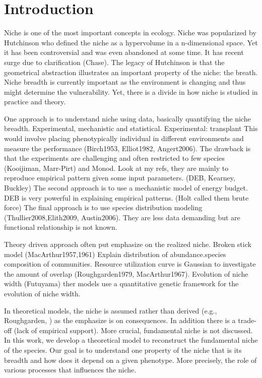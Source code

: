 \section*{Introduction}
Niche is one of the most important concepts in ecology.
Niche was popularized by Hutchinson \citet{Hutchinson1957} who defined the niche as a hypervolume in a n-dimensional space.
Yet it has been controversial and was even abandoned at some time.
It has recent surge due to clarification (Chase).
The legacy of Hutchinson is that the geometrical abstraction illustrates an important property of the niche: the breath.
Niche breadth is currently important as the environment is changing and thus might determine the vulnerability.
Yet, there is a divide in how niche is studied in practice and theory.

One approach is to understand niche using data, basically quantifying the niche breadth.
Experimental, mechanistic and statistical.
Experimental: transplant
This would involve placing phenotypically individual in different environments and measure the performance (Birch1953, Elliot1982, Angert2006).
The drawback is that  the experiments are challenging and often restricted to few species (Kooijiman, Marr-Pirt) and Monod.
Look at my refs, they are mainly to reproduce empirical pattern given some input parameters. (DEB, Kearney, Buckley)
The second approach is to use a mechanistic model of energy budget.
DEB is very powerful in explaining empirical patterns. (Holt called them brute force)
The final approach is to use species distribution modeling (Thullier2008,Elith2009, Austin2006).
They are less data demanding but are functional relationship is not known.
 
Theory driven approach often put emphasize on the realized niche.
Broken stick model (MacArthur1957,1961)
Explain distribution of abundance.species composition of communities.
Resource utilization curve is Gaussian to investigate the amount of overlap (Roughgarden1979, MacArthur1967).
Evolution of niche width (Futuyama) ther models use a quantitative genetic framework for the evolution of niche width.

In theoretical models, the niche is assumed rather than derived (e.g., Roughgarden, ) as the emphasize is on consequences.
In addition there is a trade-off (lack of empirical support).
More crucial, fundamental niche is not discussed. 
In this work, we develop a theoretical model to reconstruct the fundamental niche of the species.
Our goal is to understand one property of the niche that is its breadth and how does it depend on a given phenotype.
More precisely, the role of various processes that influences the niche.

